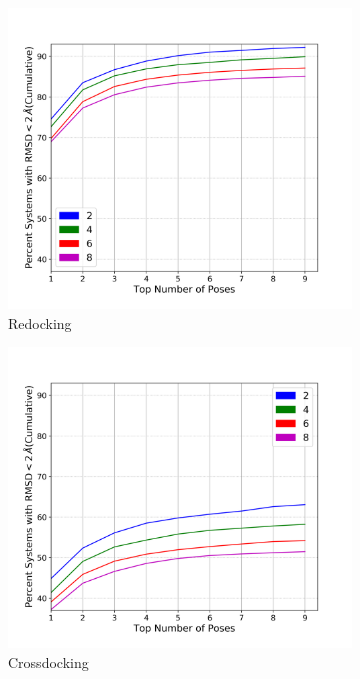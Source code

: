 \documentclass[journal=jcisd8,manuscript=article]{achemso}
\begin{document}
\begin{figure}    
        \begin{subfigure}[b]{0.48\textwidth}    
		\centering
		\includegraphics[width=\textwidth]{figures/redocking/sweep_autobox_add_line.png}
		\caption{Redocking}
		\label{fig:autobox add rd}
        \end{subfigure}    
        \begin{subfigure}[b]{0.48\textwidth}    
		\centering
		\includegraphics[width=\textwidth]{figures/crossdocking/sweep_autobox_add_line.png}
		\caption{Crossdocking}
		\label{fig:autobox add cd}
        \end{subfigure}    
	\caption{}
	\label{fig:autobox add}
\end{figure}    
\end{document}
